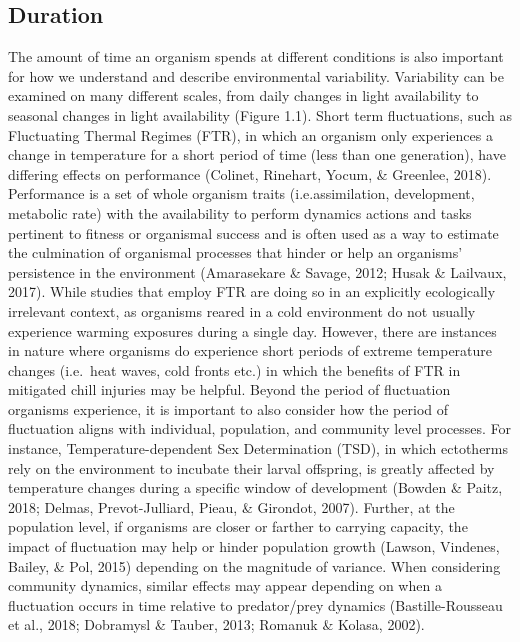 \documentclass[12pt,twoside]{reedthesis}
\begin{document}
\hypertarget{duration}{%
\subsection{Duration}\label{duration}}

The amount of time an organism spends at different conditions is also important for how we understand and describe environmental variability. Variability can be examined on many different scales, from daily changes in light availability to seasonal changes in light availability (Figure 1.1). Short term fluctuations, such as Fluctuating Thermal Regimes (FTR), in which an organism only experiences a change in temperature for a short period of time (less than one generation), have differing effects on performance (Colinet, Rinehart, Yocum, \& Greenlee, 2018). Performance is a set of whole organism traits (i.e.assimilation, development, metabolic rate) with the availability to perform dynamics actions and tasks pertinent to fitness or organismal success and is often used as a way to estimate the culmination of organismal processes that hinder or help an organisms' persistence in the environment (Amarasekare \& Savage, 2012; Husak \& Lailvaux, 2017). While studies that employ FTR are doing so in an explicitly ecologically irrelevant context, as organisms reared in a cold environment do not usually experience warming exposures during a single day. However, there are instances in nature where organisms do experience short periods of extreme temperature changes (i.e.~heat waves, cold fronts etc.) in which the benefits of FTR in mitigated chill injuries may be helpful. Beyond the period of fluctuation organisms experience, it is important to also consider how the period of fluctuation aligns with individual, population, and community level processes. For instance, Temperature-dependent Sex Determination (TSD), in which ectotherms rely on the environment to incubate their larval offspring, is greatly affected by temperature changes during a specific window of development (Bowden \& Paitz, 2018; Delmas, Prevot-Julliard, Pieau, \& Girondot, 2007). Further, at the population level, if organisms are closer or farther to carrying capacity, the impact of fluctuation may help or hinder population growth (Lawson, Vindenes, Bailey, \& Pol, 2015) depending on the magnitude of variance. When considering community dynamics, similar effects may appear depending on when a fluctuation occurs in time relative to predator/prey dynamics (Bastille-Rousseau et al., 2018; Dobramysl \& Tauber, 2013; Romanuk \& Kolasa, 2002).
\end{document}
